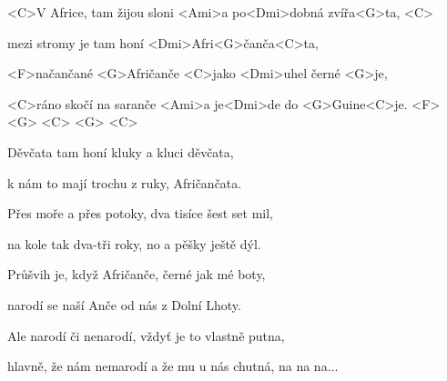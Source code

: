 
\zs

<C>V Africe, tam žijou sloni <Ami>a po<Dmi>dobná 
zvířa<G>ta, <C>


mezi stromy je tam honí <Dmi>Afri<G>čanča<C>ta,


<F>načančané <G>Afričanče <C>jako <Dmi>uhel černé 
<G>je,


<C>ráno skočí na saranče <Ami>a je<Dmi>de do <G>Guine<C>je. <F> <G> <C> <G> <C> 

\ks
\zs

Děvčata tam honí kluky a kluci děvčata,

k nám to mají trochu z ruky, Afričančata.

Přes moře a přes potoky, dva tisíce šest set mil,

na kole tak dva-tři roky, no a pěšky ještě dýl.

\ks
\zs

Průšvih je, když Afričanče, černé jak mé boty,

narodí se naší Anče od nás z Dolní Lhoty.

Ale narodí či nenarodí, vždyť je to vlastně putna,

hlavně, že nám nemarodí a že mu u nás chutná, na na na...

\ks

\kp
